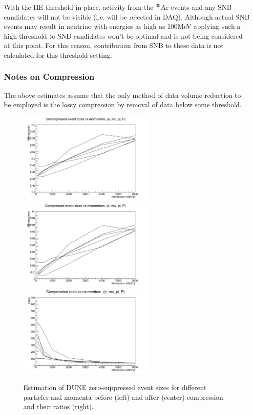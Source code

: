 %

With the HE threshold in place, activity from the $^{39}$Ar events and any SNB
candidates will not be visible (i.e. will be rejected in DAQ). Although actual SNB
events may result in neutrino with energies as high as 100MeV applying such a high
threshold to SNB candidates won't be optimal and is not being considered at this point.
For this reason, contribution from SNB to these data is not calculated for this threshold setting.


\subsubsection{Notes on Compression}
\label{sec:data-compression}

The above estimates assume that the only method of data volume reduction to be employed is the
lossy compression by removal of data below some threshold.

\begin{figure}
	\centering
	\includegraphics[width=0.6\textwidth]{btot.png}
	\includegraphics[width=0.6\textwidth]{bzip.png}
	\includegraphics[width=0.6\textwidth]{brat.png}
	\caption{Estimation of DUNE zero-suppressed event sizes for different particles and momenta before (left) and after (center)  compression and their ratios (right).}
	\label{fig:data-compression}
\end{figure}

